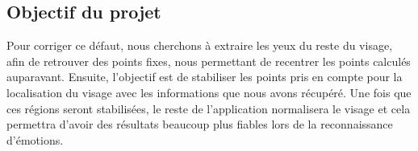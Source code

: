\subsection{Objectif du projet}
Pour corriger ce défaut, nous cherchons à extraire les yeux du reste du visage, afin 
de retrouver des points fixes, nous permettant de recentrer les points calculés auparavant.
Ensuite, l'objectif est de stabiliser les points pris en compte pour la localisation du visage avec les informations que
nous avons récupéré.  Une fois que ces
régions seront stabilisées, le reste de l'application normalisera le
visage et cela permettra d'avoir des résultats beaucoup plus fiables lors de la
reconnaissance d'émotions.\\

\newpage
